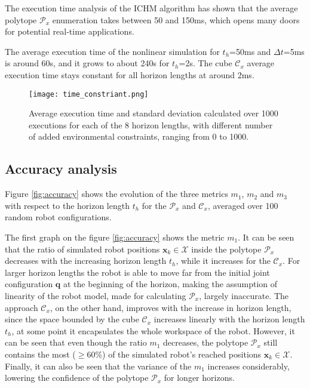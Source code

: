 The execution time analysis of the ICHM algorithm has shown that the average polytope $\mathcal{P}_x$ enumeration takes between 50 and 150ms, which opens many doors for potential real-time applications.

The average execution time of the nonlinear simulation for $t_h$=50ms and $\Delta t$=5ms is around 60s, and it grows to about 240s for $t_h$=2s. The cube $\mathcal{C}_x$ average execution time stays constant for all horizon lengths at around 2ms.

\begin{figure}[!t]
    \centering
    \texttt{[image: time\_constriant.png]}
    \caption{Average execution time and standard deviation calculated over 1000 executions for each of the 8 horizon lengths, with different number of added environmental constraints, ranging from 0 to 1000.}
    \label{fig:exec_time_constraints}
    \vspace{-0.3cm}
\end{figure}

\vspace{-0.3cm}
\subsection{Accuracy analysis}
\vspace{-0.1cm}
Figure \ref{fig:accuracy} shows the evolution of the three metrics $m_1$, $m_2$ and $m_3$ with respect to the horizon length $t_h$ for the $\mathcal{P}_x$ and $\mathcal{C}_x$, averaged over 100 random robot configurations. 

The first graph on the figure \ref{fig:accuracy} shows the metric $m_1$. It can be seen that the ratio of simulated robot positions $\bm{x}_k \in \mathcal{X}$ inside the polytope $\mathcal{P}_x$ decreases with the increasing horizon length $t_h$, while it increases for the $\mathcal{C}_x$. For larger horizon lengths the robot is able to move far from the initial joint configuration $\bm{q}$ at the beginning of the horizon, making the assumption of linearity of the robot model, made for calculating $\mathcal{P}_x$, largely inaccurate. The approach $\mathcal{C}_x$, on the other hand, improves with the increase in horizon length, since the space bounded by the cube $\mathcal{C}_x$ increases linearly with the horizon length $t_h$, at some point it encapsulates the whole workspace of the robot. However, it can be seen that even though the ratio $m_1$ decreases, the polytope $\mathcal{P}_x$ still contains the most ($\geq$60\%) of the simulated robot's reached positions $\bm{x}_k\in\mathcal{X}$. Finally, it can also be seen that the variance of the $m_1$ increases considerably, lowering the confidence of the polytope $\mathcal{P}_x$ for longer horizons.

